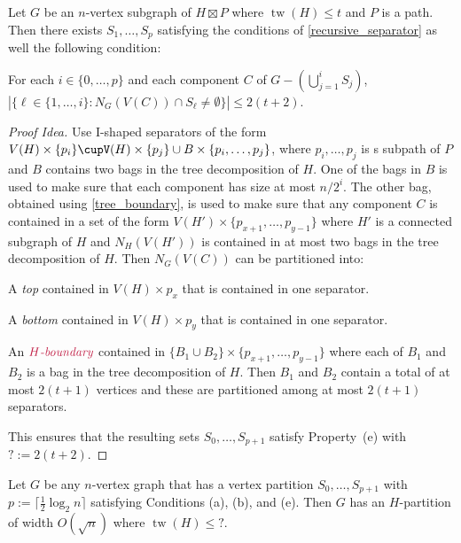 \documentclass{patmorin}
\renewcommand{\le}{\leqslant}
\newcommand{\defin}[1]{\emph{\textcolor{brightmaroon}{#1}}}
\DeclareMathOperator{\tw}{tw}
\begin{document}
\begin{lem}\label{product_partition}
  Let $G$ be an $n$-vertex subgraph of $H\boxtimes P$ where $\tw(H)\le t$ and $P$ is a path.  Then there exists $S_1,\ldots,S_p$ satisfying the conditions of \cref{recursive_separator} as well the following condition:
  \begin{compactenum}[(a)]\setcounter{enumi}{4}
    \item For each $i\in\{0,\ldots,p\}$ and each component $C$ of $G-(\bigcup_{j=1}^i S_j)$, $|\{\ell\in\{1,\ldots,i\}:N_G(V(C))\cap S_\ell\neq\emptyset\}|\le {2(t+2)}$.
  \end{compactenum}
\end{lem}

\begin{proof}[Proof Idea]
  Use I-shaped separators of the form $V(H)\times\{p_i\}\cupV(H)\times\{p_j\}\cup B\times\{p_i,\ldots,p_j\}$, where $p_i,\ldots,p_j$ is s subpath of $P$ and $B$ contains two bags in the tree decomposition of $H$.  One of the bags in $B$ is used to make sure that each component has size at most $n/2^i$.  The other bag, obtained using \cref{tree_boundary}, is used to make sure that any component $C$ is contained in a set of the form $V(H')\times \{p_{x+1},\ldots,p_{y-1}\}$ where $H'$ is a connected subgraph of $H$ and $N_H(V(H'))$ is contained in at most two bags in the tree decomposition of $H$.  Then $N_G(V(C))$ can be partitioned into:
  \begin{compactenum}
    \item A \defin{top} contained in $V(H)\times p_x$ that is contained in one separator.
    \item A \defin{bottom} contained in $V(H)\times p_y$ that is contained in one separator.
    \item An $\defin{$H$-boundary}$ contained in $\{B_1\cup B_2\}\times \{p_{x+1},\ldots,p_{y-1}\}$ where each of $B_1$ and $B_2$ is a bag in the tree decomposition of $H$. Then $B_1$ and $B_2$ contain a total of at most $2(t+1)$ vertices and these are partitioned among at most $2(t+1)$ separators.
  \end{compactenum}
  This ensures that the resulting sets $S_0,\ldots,S_{p+1}$ satisfy Property~(e) with ${?}:=2(t+2)$.
\end{proof}



\begin{thm}
  Let $G$ be any $n$-vertex graph that has a vertex partition $S_0,\ldots,S_{p+1}$ with $p:=\lceil\tfrac{1}{2}\log_2 n\rceil$ satisfying Conditions (a), (b), and (e).  Then $G$ has an $H$-partition of width $O(\sqrt{n})$ where $\tw(H)\le {?}$.
\end{thm}
\end{document}
